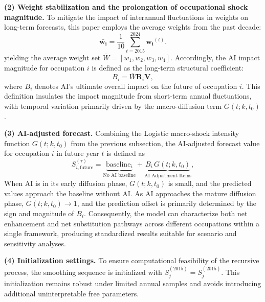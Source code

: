 \documentclass{mcmthesis}
\begin{document}
\noindent \textbf{(2) Weight stabilization and the prolongation of occupational shock magnitude.}
To mitigate the impact of interannual fluctuations in weights on long-term forecasts, this paper employs the average weights from the past decade:
\begin{equation}
\bar{\mathbf{w_i}}=\frac{1}{10}\sum_{t=2015}^{2024}\mathbf{w_i}^{(t)}.
\label{eq:wbar}
\end{equation}
yielding the average weight set $\overline{W}=[w_1,w_2,w_3,w_4]$.
Accordingly, the AI impact magnitude for occupation $i$ is defined as the long-term structural coefficient:
\begin{equation}
B_i={\overline{W}}\mathbf{R}_i\mathbf{V},
\label{eq:B_longrun}
\end{equation}
where $B_i$ denotes AI's ultimate overall impact on the future of occupation $i$. This definition insulates the impact magnitude from short-term annual fluctuations, with temporal variation primarily driven by the macro-diffusion term $G(t;k,t_0)$.

\noindent \textbf{(3) AI-adjusted forecast.}
Combining the Logistic macro-shock intensity function $G(t;k,t_0)$ from the previous subsection, the AI-adjusted forecast value for occupation $i$ in future year $t$ is defined as
\begin{equation}
S_{i,\mathrm{future}}^{(\tau)}
=\underbrace{\mathrm{baseline}_{i}}_{\text{No AI baseline}}
+\underbrace{B_i\,G(t;k,t_0)}_{\text{AI Adjustment Items}},
\label{eq:ai_adjusted_forecast_cn}
\end{equation}
When AI is in its early diffusion phase, $G(t;k,t_0)$ is small, and the predicted values approach the baseline without AI. As AI approaches the mature diffusion phase, $G(t;k,t_0)\to 1$, and the prediction offset is primarily determined by the sign and magnitude of $B_i$. Consequently, the model can characterize both net enhancement and net substitution pathways across different occupations within a single framework, producing standardized results suitable for scenario and sensitivity analyses.

\noindent \textbf{(4) Initialization settings.}
To ensure computational feasibility of the recursive process, the smoothing sequence is initialized with
${S}_j^{(2015)}=S_j^{(2015)}.$ This initialization remains robust under limited annual samples and avoids introducing additional uninterpretable free parameters.



\end{document}
